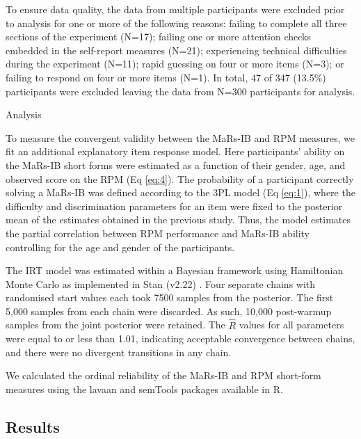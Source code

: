 \documentclass[a4paper,man,natbib]{apa6}
\makeatletter
\renewcommand{\subsubsection}{\@startsection{subsubsection}{3}
  {\z@}%
  {\b@level@two@skip}{\e@level@two@skip}%
  {\normalfont\normalsize\bfseries}}
\makeatother
\begin{document}
To ensure data quality, the data from multiple participants were excluded prior to analysis for one or more of the following reasons: failing to complete all three sections of the experiment (N=17); failing one or more attention checks \citep{zorowitz2021inattentive} embedded in the self-report measures (N=21); experiencing technical difficulties during the experiment (N=11); rapid guessing on four or more items (N=3); or failing to respond on four or more items (N=1). In total, 47 of 347 (13.5\%) participants were excluded leaving the data from N=300 participants for analysis.

\subsubsection{Analysis}

To measure the convergent validity between the MaRs-IB and RPM measures, we fit an additional explanatory item response model. Here participants' ability on the MaRs-IB short forms were estimated as a function of their gender, age, and observed score on the RPM (Eq \ref{eq:4}). The probability of a participant correctly solving a MaRs-IB was defined according to the 3PL model (Eq \ref{eq:1}), where the difficulty and discrimination parameters for an item were fixed to the posterior mean of the estimates obtained in the previous study. Thus, the model estimates the partial correlation between RPM performance and MaRs-IB ability controlling for the age and gender of the participants.

The IRT model was estimated within a Bayesian framework using Hamiltonian Monte Carlo as implemented in Stan (v2.22) \citep{carpenter2017stan}. Four separate chains with randomised start values each took 7500 samples from the posterior. The first 5,000 samples from each chain were discarded. As such, 10,000 post-warmup samples from the joint posterior were retained. The $\hat{R}$ values for all parameters were equal to or less than 1.01, indicating acceptable convergence between chains, and there were no divergent transitions in any chain. 

We calculated the ordinal reliability of the MaRs-IB and RPM short-form measures using the lavaan \citep{lavaan} and semTools \citep{semtools} packages available in R.

\subsection{Results}
\end{document}
